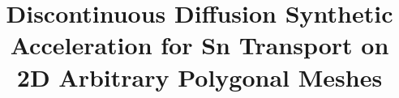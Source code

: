 \documentclass{article}
\renewcommand{\(}{\left(}
\renewcommand{\)}{\right)}
\renewcommand{\[}{\left[}
\renewcommand{\]}{\right]}
\begin{document}
\title{Discontinuous Diffusion Synthetic Acceleration for Sn Transport on
2D Arbitrary Polygonal Meshes}
\author{} 
\date{}
\maketitle











\end{document}
